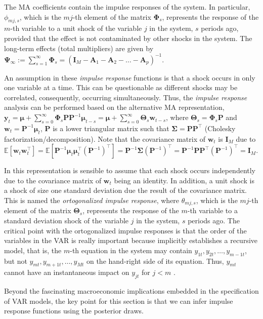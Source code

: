 The MA coefficients contain the impulse responses of the system. In particular, $\phi_{mj,s}$, which is the $mj$-th element of the matrix $\bm{\Phi}_s$, represents the response of the $m$-th variable to a unit shock of the variable $j$ in the system, $s$ periods ago, provided that the effect is not contaminated by other shocks in the system. The long-term effects (total multipliers) are given by $\bm{\Psi}_{\infty}:=\sum_{s=1}^{\infty}\bm{\Phi}_s=(\bm{I}_M-\bm{A}_{1}-\bm{A}_{2}-\dots-\bm{A}_{p})^{-1}$.

An assumption in these \textit{impulse response} functions is that a shock occurs in only one variable at a time. This can be questionable as different shocks may be correlated, consequently, occurring simultaneously. Thus, the \textit{impulse response} analysis can be performed based on the alternative MA representation, $\bm{y}_t=\bm{\mu} + \sum_{s=0}^{\infty}\bm{\Phi}_s\bm{P}\bm{P}^{-1}\bm{\mu}_{t-s}=\bm{\mu} + \sum_{s=0}^{\infty}\bm{\Theta}_s\bm{w}_{t-s}$, where $\bm{\Theta}_s=\bm{\Phi}_s\bm{P}$ and $\bm{w}_{t}=\bm{P}^{-1}\bm{\mu}_{t}$, $\bm{P}$ is a lower triangular matrix such that $\bm{\Sigma}=\bm{P}\bm{P}^{\top}$ (Cholesky factorization/decomposition). Note that the covariance matrix of $\bm{w}_t$ is $\bm{I}_M$ due to $\mathbb{E}[\bm{w}_t\bm{w}_t^{\top}]=\mathbb{E}[\bm{P}^{-1}\bm{\mu}_{t}\bm{\mu}_t^{\top}(\bm{P}^{-1})^{\top}]=\bm{P}^{-1}\bm{\Sigma}(\bm{P}^{-1})^{\top}=\bm{P}^{-1}\bm{P}\bm{P}^{\top}(\bm{P}^{-1})^{\top}=\bm{I}_M$. 

In this representation is sensible to assume that each shock occurs independently due to the covariance matrix of $\bm{w}_t$ being an identity. In addition, a unit shock is a shock of size one standard deviation due the result of the covariance matrix. This is named the \textit{ortogonalized impulse response}, where $\theta_{mj,s}$, which is the $mj$-th element of the matrix $\bm{\Theta}_s$, represents the response of the $m$-th variable to a standard deviation shock of the variable $j$ in the system, $s$ periods ago. The critical point with the ortogonalized impulse responses is that the order of the variables in the VAR is really important because implicitly establishes a recursive model, that is, the $m$-th equation in the system may contain $y_{1t}, y_{2t}, \dots, y_{m-1t}$, but not $y_{mt}, y_{m+1t}, \dots, y_{Mt}$ on the hand-right side of its equation. Thus, $y_{mt}$ cannot have an instantaneous impact on $y_{jt}$ for $j<m$ \cite[Chap.~2]{helmut2005new}.

Beyond the fascinating macroeconomic implications embedded in the specification of VAR models, the key point for this section is that we can infer impulse response functions using the posterior draws.\\

